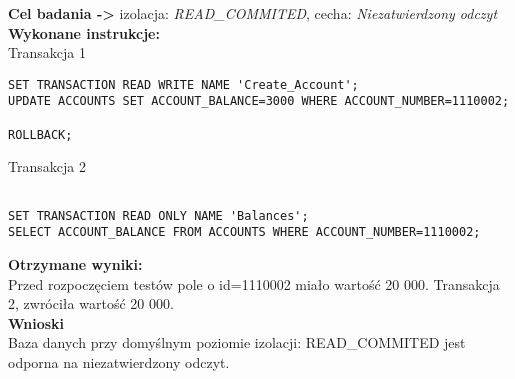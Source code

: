 \documentclass[11pt,oneside, a4paper]{article}
\title{}
\date{}
\begin{document}
\justify
\textbf{Cel badania ->} izolacja:
\textit{READ\_COMMITED}, cecha:
\textit{Niezatwierdzony odczyt} \\
\textbf{Wykonane instrukcje: } \\
Transakcja 1
\begin{lstlisting}
SET TRANSACTION READ WRITE NAME 'Create_Account';
UPDATE ACCOUNTS SET ACCOUNT_BALANCE=3000 WHERE ACCOUNT_NUMBER=1110002;

ROLLBACK;
\end{lstlisting}
Transakcja 2
\begin{lstlisting}

SET TRANSACTION READ ONLY NAME 'Balances';
SELECT ACCOUNT_BALANCE FROM ACCOUNTS WHERE ACCOUNT_NUMBER=1110002;
\end{lstlisting}
\textbf{Otrzymane wyniki:} \\
    Przed rozpoczęciem testów pole o id=1110002 miało wartość 20 000. Transakcja 2, zwróciła  wartość 20 000.\\
\textbf{Wnioski} \\
    Baza danych przy domyślnym poziomie izolacji: READ\_COMMITED jest odporna na niezatwierdzony odczyt. \\
\end{document}
